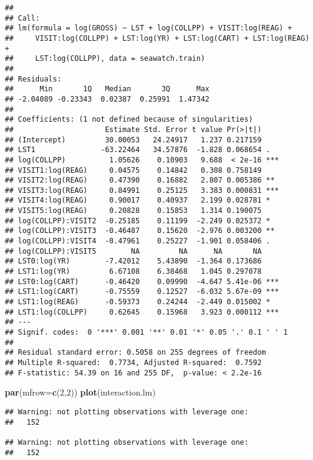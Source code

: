 \documentclass[]{article}
\newenvironment{Shaded}{\begin{snugshade}}{\end{snugshade}}
\newcommand{\KeywordTok}[1]{\textcolor[rgb]{0.13,0.29,0.53}{\textbf{#1}}}
\newcommand{\DataTypeTok}[1]{\textcolor[rgb]{0.13,0.29,0.53}{#1}}
\newcommand{\DecValTok}[1]{\textcolor[rgb]{0.00,0.00,0.81}{#1}}
\newcommand{\NormalTok}[1]{#1}
\begin{document}
\begin{verbatim}
## 
## Call:
## lm(formula = log(GROSS) ~ LST + log(COLLPP) + VISIT:log(REAG) + 
##     VISIT:log(COLLPP) + LST:log(YR) + LST:log(CART) + LST:log(REAG) + 
##     LST:log(COLLPP), data = seawatch.train)
## 
## Residuals:
##      Min       1Q   Median       3Q      Max 
## -2.04089 -0.23343  0.02387  0.25991  1.47342 
## 
## Coefficients: (1 not defined because of singularities)
##                     Estimate Std. Error t value Pr(>|t|)    
## (Intercept)         30.00053   24.24917   1.237 0.217159    
## LST1               -63.22464   34.57876  -1.828 0.068654 .  
## log(COLLPP)          1.05626    0.10903   9.688  < 2e-16 ***
## VISIT1:log(REAG)     0.04575    0.14842   0.308 0.758149    
## VISIT2:log(REAG)     0.47390    0.16882   2.807 0.005386 ** 
## VISIT3:log(REAG)     0.84991    0.25125   3.383 0.000831 ***
## VISIT4:log(REAG)     0.90017    0.40937   2.199 0.028781 *  
## VISIT5:log(REAG)     0.20828    0.15853   1.314 0.190075    
## log(COLLPP):VISIT2  -0.25185    0.11199  -2.249 0.025372 *  
## log(COLLPP):VISIT3  -0.46487    0.15620  -2.976 0.003200 ** 
## log(COLLPP):VISIT4  -0.47961    0.25227  -1.901 0.058406 .  
## log(COLLPP):VISIT5        NA         NA      NA       NA    
## LST0:log(YR)        -7.42012    5.43890  -1.364 0.173686    
## LST1:log(YR)         6.67108    6.38468   1.045 0.297078    
## LST0:log(CART)      -0.46420    0.09990  -4.647 5.41e-06 ***
## LST1:log(CART)      -0.75559    0.12527  -6.032 5.67e-09 ***
## LST1:log(REAG)      -0.59373    0.24244  -2.449 0.015002 *  
## LST1:log(COLLPP)     0.62645    0.15968   3.923 0.000112 ***
## ---
## Signif. codes:  0 '***' 0.001 '**' 0.01 '*' 0.05 '.' 0.1 ' ' 1
## 
## Residual standard error: 0.5058 on 255 degrees of freedom
## Multiple R-squared:  0.7734, Adjusted R-squared:  0.7592 
## F-statistic: 54.39 on 16 and 255 DF,  p-value: < 2.2e-16
\end{verbatim}

\begin{Shaded}
\begin{Highlighting}[]
\KeywordTok{par}\NormalTok{(}\DataTypeTok{mfrow=}\KeywordTok{c}\NormalTok{(}\DecValTok{2}\NormalTok{,}\DecValTok{2}\NormalTok{))}
\KeywordTok{plot}\NormalTok{(interaction.lm)}
\end{Highlighting}
\end{Shaded}

\begin{verbatim}
## Warning: not plotting observations with leverage one:
##   152

## Warning: not plotting observations with leverage one:
##   152
\end{verbatim}
\end{document}
